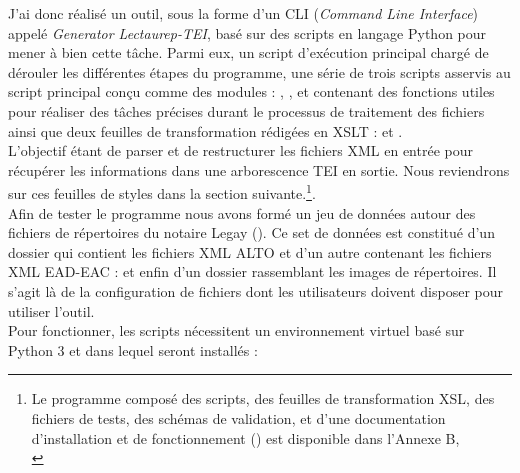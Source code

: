 J'ai donc réalisé un outil, sous la forme d'un CLI (\textit{Command Line Interface}) appelé \textit{Generator Lectaurep-TEI}, basé sur des scripts en langage Python pour mener à bien cette tâche. Parmi eux, un script d'exécution principal  chargé de dérouler les différentes étapes du programme, une série de trois scripts asservis au script principal conçu comme des modules : , , et  contenant des fonctions utiles pour réaliser des tâches précises durant le processus de traitement des fichiers ainsi que deux feuilles de transformation rédigées en XSLT :  et .\\ L'objectif étant de parser et de restructurer les fichiers XML en entrée pour récupérer les informations dans une arborescence TEI en sortie. Nous reviendrons sur ces feuilles de styles dans la section suivante.\footnote{Le programme composé des scripts, des feuilles de transformation XSL, des fichiers de tests, des schémas de validation, et d'une documentation d'installation et de fonctionnement  () est disponible dans l'Annexe B, \\
}.\\

Afin de tester le programme nous avons formé un jeu de données autour des fichiers de répertoires du notaire Legay (). Ce set de données est constitué d'un dossier  qui contient les fichiers XML ALTO et d'un autre contenant les fichiers XML EAD-EAC :   et enfin d'un dossier  rassemblant les images de répertoires. Il s'agit là de la configuration de fichiers dont les utilisateurs doivent disposer pour utiliser l'outil.\\
\newpage
Pour fonctionner, les scripts nécessitent un environnement virtuel basé sur Python 3 et dans lequel seront installés :


